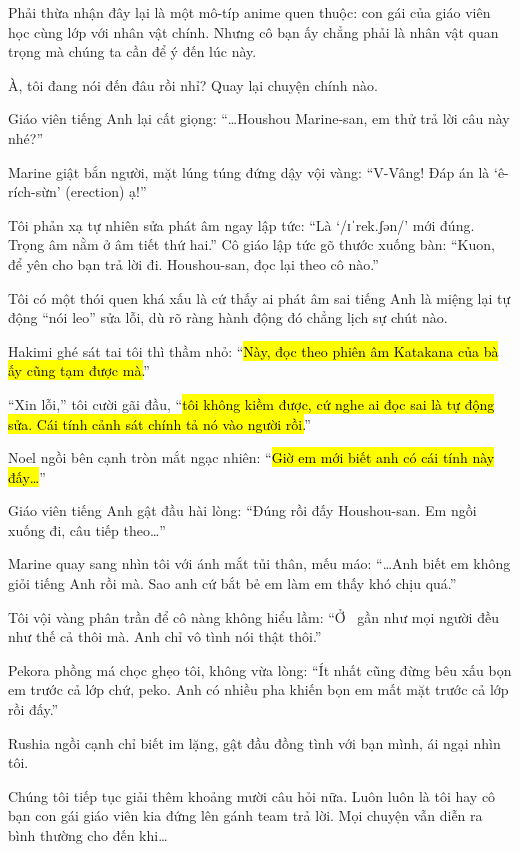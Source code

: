 \documentclass[../main.tex]{subfiles}
\begin{document}
Phải thừa nhận đây lại là một mô-típ anime quen thuộc: con gái của giáo viên học cùng lớp với nhân vật chính. Nhưng cô bạn ấy chẳng phải là nhân vật quan trọng mà chúng ta cần để ý đến lúc này.

À, tôi đang nói đến đâu rồi nhỉ? Quay lại chuyện chính nào.

Giáo viên tiếng Anh lại cất giọng: ``\dots Houshou Marine-san, em thử trả lời câu này nhé?''

Marine giật bắn người, mặt lúng túng đứng dậy vội vàng: ``V-Vâng! Đáp án là `ê-rích-sừn' (erection) ạ!''

Tôi phản xạ tự nhiên sửa phát âm ngay lập tức: ``Là `/ɪˈrek.ʃən/' mới đúng. Trọng âm nằm ở âm tiết thứ hai.'' Cô giáo lập tức gõ thước xuống bàn: ``Kuon, để yên cho bạn trả lời đi. Houshou-san, đọc lại theo cô nào.''

Tôi có một thói quen khá xấu là cứ thấy ai phát âm sai tiếng Anh là miệng lại tự động ``nói leo'' sửa lỗi, dù rõ ràng hành động đó chẳng lịch sự chút nào.

Hakimi ghé sát tai tôi thì thầm nhỏ: ``\hl{Này, đọc theo phiên âm Katakana của bà ấy cũng tạm được mà.}''

``Xin lỗi,'' tôi cười gãi đầu, ``\hl{tôi không kiềm được, cứ nghe ai đọc sai là tự động sửa. Cái tính cảnh sát chính tả nó vào người rồi.}''

Noel ngồi bên cạnh tròn mắt ngạc nhiên: ``\hl{Giờ em mới biết anh có cái tính này đấy\dots}''

Giáo viên tiếng Anh gật đầu hài lòng: ``Đúng rồi đấy Houshou-san. Em ngồi xuống đi, câu tiếp theo\dots''

Marine quay sang nhìn tôi với ánh mắt tủi thân, mếu máo: ``\dots Anh biết em không giỏi tiếng Anh rồi mà. Sao anh cứ bắt bẻ em làm em thấy khó chịu quá.''

Tôi vội vàng phân trần để cô nàng không hiểu lầm: ``Ở \hll\ gần như mọi người đều như thế cả thôi mà. Anh chỉ vô tình nói thật thôi.''

Pekora phồng má chọc ghẹo tôi, không vừa lòng: ``Ít nhất cũng đừng bêu xấu bọn em trước cả lớp chứ, peko. Anh có nhiều pha khiến bọn em mất mặt trước cả lớp rồi đấy.''

Rushia ngồi cạnh chỉ biết im lặng, gật đầu đồng tình với bạn mình, ái ngại nhìn tôi.

Chúng tôi tiếp tục giải thêm khoảng mười câu hỏi nữa. Luôn luôn là tôi hay cô bạn con gái giáo viên kia đứng lên gánh team trả lời. Mọi chuyện vẫn diễn ra bình thường cho đến khi\dots
\end{document}

